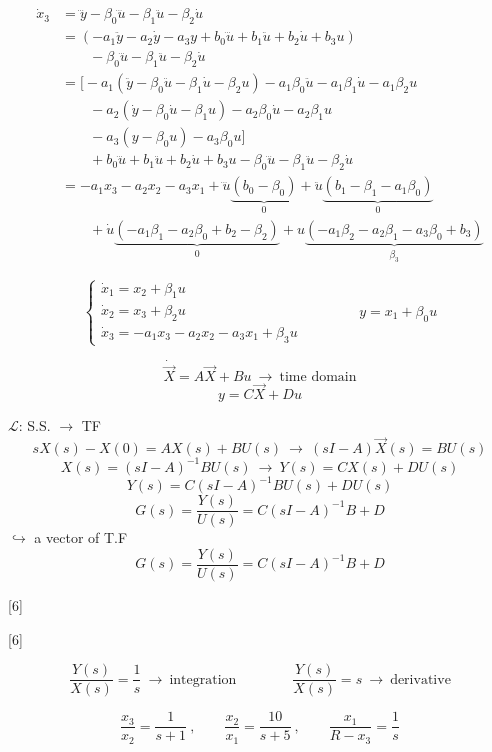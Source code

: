\documentclass[11pt,a4paper]{article}
\begin{document}
\begin{align*}
\dot{x}_3&=\dddot{y}-\beta_0\dddot{u}-\beta_1\ddot{u}-\beta_2\dot{u}\\
&=\left(-a_1\ddot{y}-a_2\dot{y}-a_3y+b_0\dddot{u}+b_1\ddot{u}+b_2\dot{u}+b_3u\right)\\
&\qquad-\beta_0\dddot{u}-\beta_1\ddot{u}-\beta_2\dot{u}\\
&=\Big[-a_1\left(\ddot{y}-\beta_0\ddot{u}-\beta_1\dot{u}-\beta_2u\right)-a_1\beta_0\ddot{u}-a_1\beta_1\dot{u}-a_1\beta_2u\\
&\qquad-a_2\left(\dot{y}-\beta_0\dot{u}-\beta_1u\right)-a_2\beta_0\dot{u}-a_2\beta_1u\\
&\qquad-a_3\left(y-\beta_0u\right)-a_3\beta_0u\Big]\\
&\qquad+b_0\dddot{u}+b_1\ddot{u}+b_2\dot{u}+b_3u-\beta_0\dddot{u}-\beta_1\ddot{u}-\beta_2\dot{u}\\
&=-a_1x_3-a_2x_2-a_3x_1+\dddot{u}\underbrace{(b_0-\beta_0)}_{0}+\ddot{u}\underbrace{(b_1-\beta_1-a_1\beta_0)}_{0}\\
&\qquad+\dot{u}\underbrace{(-a_1\beta_1-a_2\beta_0+b_2-\beta_2)}_{0}+u\underbrace{(-a_1\beta_2-a_2\beta_1-a_3\beta_0+b_3)}_{\beta_3}
\end{align*}

\[
\left\{\begin{array}{l}
\dot{x}_1=x_2+\beta_1u\\
\dot{x}_2=x_3+\beta_2u\\
\dot{x}_3=-a_1x_3-a_2x_2-a_3x_1+\beta_3u
\end{array}\right.
\qquad\qquad y=x_1+\beta_0u
\]

\[
\dot{\vec{X}}=A\vec{X}+Bu\ \to\ \text{time domain}
\]
\[
y=C\vec{X}+Du
\]

$\mathcal{L}$: S.S. $\to$ TF
\[
sX(s)-X(0)=AX(s)+BU(s)\ \to\ (sI-A)\vec{X}(s)=BU(s)
\]
\[
X(s)=(sI-A)^{-1}BU(s)\ \to\ Y(s)=CX(s)+DU(s)
\]
\[
Y(s)=C(sI-A)^{-1}BU(s)+DU(s)
\]
\[
G(s)=\frac{Y(s)}{U(s)}=C(sI-A)^{-1}B+D
\]
$\hookrightarrow$ a vector of T.F
\[
G(s)=\frac{Y(s)}{U(s)}=C(sI-A)^{-1}B+D
\]

[6]

[6]

\[
\frac{Y(s)}{X(s)}=\frac{1}{s}\ \to\ \text{integration}
\qquad\qquad
\frac{Y(s)}{X(s)}=s\ \to\ \text{derivative}
\]

\[
\frac{x_3}{x_2}=\frac{1}{s+1}\ ,\qquad \frac{x_2}{x_1}=\frac{10}{s+5}\ ,\qquad \frac{x_1}{R-x_3}=\frac{1}{s}
\]
\end{document}
